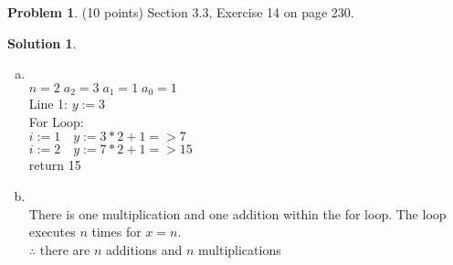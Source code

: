 \documentclass{article}
\theoremstyle{definition}
\newtheorem{problem}{Problem}
\newtheorem*{solution}{Solution}
\begin{document}
\begin{problem} (10 points) Section 3.3, Exercise 14 on page 230.
\end{problem}
\begin{solution}\ \\
\begin{enumerate}[a)]
  \item \ \\
    $n=2\; a_2=3 \; a_1=1 \; a_0=1$ \\
    Line 1: $y:= 3$ \\
    For Loop: \\
    $i:=1 \quad y:= 3*2 + 1 => 7$ \\
    $i:=2 \quad y:= 7*2 + 1 => 15 $ \\
    return 15
  \item \ \\
  There is one multiplication and one addition within the for loop. The loop executes $n$ times for $x=n$. \\
  $\therefore$ there are $n$ additions and $n$ multiplications 
\end{enumerate}
\end{solution}
\end{document}
